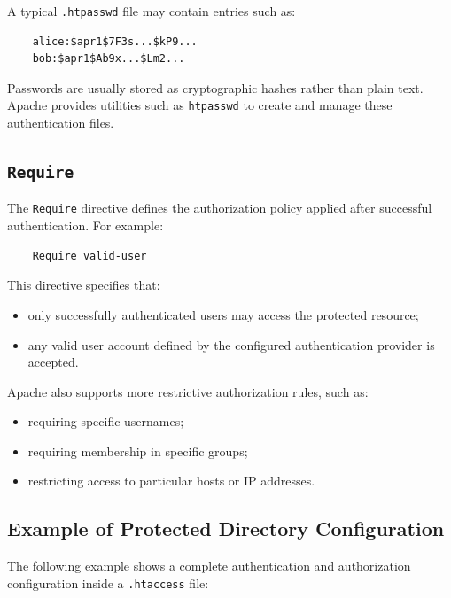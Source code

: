 \documentclass{scrbook}
\begin{document}
	A typical \texttt{.htpasswd} file may contain entries such as:
	
	\begin{lstlisting}
	alice:$apr1$7F3s...$kP9...
	bob:$apr1$Ab9x...$Lm2...
	\end{lstlisting}
	
	Passwords are usually stored as cryptographic hashes rather than plain text. Apache provides utilities such as \texttt{htpasswd} to create and manage these authentication files.
	
	\subsection{\texttt{Require}}
	
	The \texttt{Require} directive defines the authorization policy applied after successful authentication. For example:
	
	\begin{lstlisting}
	Require valid-user
	\end{lstlisting}
	
	This directive specifies that:
	\begin{itemize}
		\item only successfully authenticated users may access the protected resource;
		
		\item any valid user account defined by the configured authentication provider is accepted.
	\end{itemize}
	
	Apache also supports more restrictive authorization rules, such as:
	\begin{itemize}
		\item requiring specific usernames;
		
		\item requiring membership in specific groups;
		
		\item restricting access to particular hosts or IP addresses.
	\end{itemize}
	
	\subsection{Example of Protected Directory Configuration}
	
	The following example shows a complete authentication and authorization configuration inside a \texttt{.htaccess} file:
	
\end{document}
